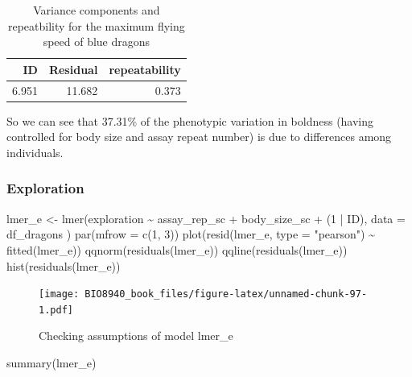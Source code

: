 \documentclass[
  12pt,
]{book}
\newenvironment{Shaded}{\begin{snugshade}}{\end{snugshade}}
\newcommand{\AttributeTok}[1]{\textcolor[rgb]{0.77,0.63,0.00}{#1}}
\newcommand{\DecValTok}[1]{\textcolor[rgb]{0.00,0.00,0.81}{#1}}
\newcommand{\FunctionTok}[1]{\textcolor[rgb]{0.00,0.00,0.00}{#1}}
\newcommand{\NormalTok}[1]{#1}
\newcommand{\OtherTok}[1]{\textcolor[rgb]{0.56,0.35,0.01}{#1}}
\newcommand{\SpecialCharTok}[1]{\textcolor[rgb]{0.00,0.00,0.00}{#1}}
\newcommand{\StringTok}[1]{\textcolor[rgb]{0.31,0.60,0.02}{#1}}
\begin{document}
\begin{table}

\caption{\label{tab:unnamed-chunk-96}Variance components and repeatbility for the maximum
   flying speed of blue dragons}
\centering
\begin{tabular}[t]{r|r|r}
\hline
ID & Residual & repeatability\\
\hline
6.951 & 11.682 & 0.373\\
\hline
\end{tabular}
\end{table}

So we can see that 37.31\% of the phenotypic variation in boldness (having controlled for body size and assay
repeat number) is due to differences among individuals.

\hypertarget{exploration}{%
\subsubsection{Exploration}\label{exploration}}

\begin{Shaded}
\begin{Highlighting}[]
\NormalTok{lmer\_e }\OtherTok{\textless{}{-}} \FunctionTok{lmer}\NormalTok{(exploration }\SpecialCharTok{\textasciitilde{}}\NormalTok{ assay\_rep\_sc }\SpecialCharTok{+}\NormalTok{ body\_size\_sc }\SpecialCharTok{+}\NormalTok{ (}\DecValTok{1} \SpecialCharTok{|}\NormalTok{ ID),}
  \AttributeTok{data =}\NormalTok{ df\_dragons}
\NormalTok{)}
\FunctionTok{par}\NormalTok{(}\AttributeTok{mfrow =} \FunctionTok{c}\NormalTok{(}\DecValTok{1}\NormalTok{, }\DecValTok{3}\NormalTok{))}
\FunctionTok{plot}\NormalTok{(}\FunctionTok{resid}\NormalTok{(lmer\_e, }\AttributeTok{type =} \StringTok{"pearson"}\NormalTok{) }\SpecialCharTok{\textasciitilde{}} \FunctionTok{fitted}\NormalTok{(lmer\_e))}
\FunctionTok{qqnorm}\NormalTok{(}\FunctionTok{residuals}\NormalTok{(lmer\_e))}
\FunctionTok{qqline}\NormalTok{(}\FunctionTok{residuals}\NormalTok{(lmer\_e))}
\FunctionTok{hist}\NormalTok{(}\FunctionTok{residuals}\NormalTok{(lmer\_e))}
\end{Highlighting}
\end{Shaded}

\begin{figure}
\centering
\texttt{[image: BIO8940\_book\_files/figure-latex/unnamed-chunk-97-1.pdf]}
\caption{\label{fig:unnamed-chunk-97}Checking assumptions of model lmer\_e}
\end{figure}

\begin{Shaded}
\begin{Highlighting}[]
\FunctionTok{summary}\NormalTok{(lmer\_e)}
\end{Highlighting}
\end{Shaded}
\end{document}
